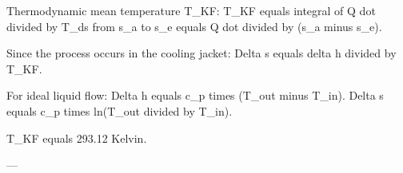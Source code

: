 Thermodynamic mean temperature T_KF:  
T_KF equals integral of Q dot divided by T_ds from s_a to s_e equals Q dot divided by (s_a minus s_e).  

Since the process occurs in the cooling jacket:  
Delta s equals delta h divided by T_KF.  

For ideal liquid flow:  
Delta h equals c_p times (T_out minus T_in).  
Delta s equals c_p times ln(T_out divided by T_in).  

T_KF equals 293.12 Kelvin.  

---